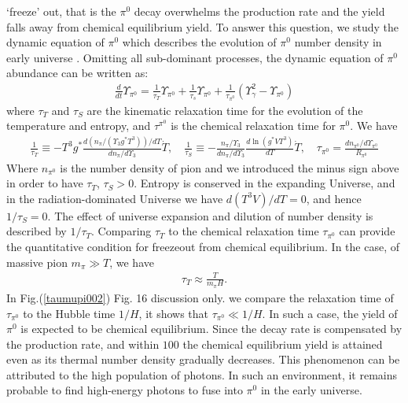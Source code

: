 \documentclass[universe,article,submit,moreauthors,pdftex,a4paper]{Definitions/mdpi}
\newcommand*{\xred}{\color{red}}
\begin{document}
`freeze' out, that is the $\pi^0$ decay overwhelms the production rate and the yield
falls away from chemical equilibrium yield. To answer this question, we study the dynamic equation of $\pi^0$ which describes the evolution of $\pi^0$ number density in early universe \cite{Fromerth:2012fe}. Omitting all sub-dominant processes, the dynamic equation of $\pi^0$ abundance can be written as:
\begin{align}
\frac{d}{dt}\Upsilon_{\pi^0}=\frac{1}{\tau_T}\Upsilon_{\pi^0}+\frac{1}{\tau_s}\Upsilon_{\pi^0}+\frac{1}{\tau_{\pi^0}}\left(\Upsilon^2_\gamma-\Upsilon_{\pi^0}\right)
\end{align}
where $\tau_T$ and $\tau_S$ are the kinematic relaxation time for the evolution of the temperature and entropy, and $\tau^{\pi^0}$ is the chemical relaxation time for $\pi^0$. We have
\begin{align}
\frac{1}{\tau_T}\equiv -T^3g^*\frac{d (n_{\pi}/(\Upsilon_3
g^*T^3))/dT}{dn_{\pi}/d{\Upsilon_3}}{\dot T},\label{tauT} \quad
\frac{1}{\tau_{S}}\equiv
-\frac{n_{\pi}/\Upsilon_3}{dn_{\pi}/d{\Upsilon_3}}\frac{d\ln (g^*VT^3)}{dT}
\dot{T},\quad
\tau_{\pi^0}=\frac{dn_{\pi^0}/d\Upsilon_{\pi^0}}{R_{\pi^0}} 
\end{align}
Where $n_{\pi^0}$ is the number density of pion and we introduced the minus sign above in order to have $\tau_T$, $\tau_S>0$. Entropy is conserved in the expanding Universe, and in the radiation-dominated Universe we have $d(T^3V)/dT=0$, and hence $1/\tau_S=0$. The effect of universe expansion and dilution of number density is described by $1/\tau_T$. Comparing $\tau_T$ to the chemical relaxation time $\tau_{\pi^0}$ can provide the quantitative condition for freezeout from chemical equilibrium. In the case, of massive pion $m_{\pi}\gg T$, we have \cite{Kuznetsova:2009xh}
\begin{align}
\tau_T\approx\frac{T}{m_{\pi}H}.
\end{align}
 In Fig.(\ref{taumupi002}) {\xred Fig. 16 discussion only.} we compare the relaxation time of $\tau_{\pi^0}$ to the Hubble time $1/H$, it shows that $\tau_{\pi^0}\ll 1/H$. In such a case, the yield of $\pi^0$ is expected to be chemical equilibrium. Since the decay rate is compensated by the production rate, and within $100$ the chemical equilibrium yield is attained even as its thermal number density gradually decreases. This phenomenon can be attributed to the high population of photons. In such an environment, it remains probable to find high-energy photons to fuse into $\pi^0$ in the early universe. 
\end{document}
